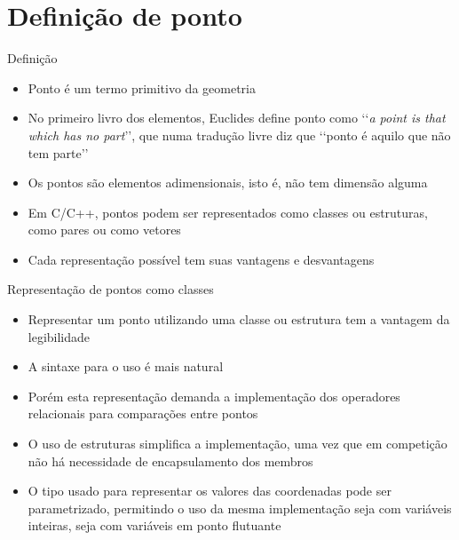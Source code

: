 \section{Definição de ponto}

\begin{frame}[fragile]{Definição}

    \begin{itemize}
        \item Ponto é um termo primitivo da geometria
        \pause

        \item No primeiro livro dos elementos, Euclides define ponto como 
            \lq\lq \textit{a point is that which has no part}\rq\rq, que numa tradução livre 
            diz que \lq\lq ponto é aquilo que não tem parte\rq\rq
        \pause

        \item Os pontos são elementos adimensionais, isto é, não tem dimensão alguma
        \pause

        \item Em C/C++, pontos podem ser representados como classes ou estruturas, como
            pares ou como vetores
        \pause

        \item Cada representação possível tem suas vantagens e desvantagens
   \end{itemize}

\end{frame}

\begin{frame}[fragile]{Representação de pontos como classes}

    \begin{itemize}
        \item Representar um ponto utilizando uma classe ou estrutura tem a vantagem da 
            legibilidade 
        \pause

        \item A sintaxe para o uso é mais natural
        \pause

        \item Porém esta representação demanda a implementação dos operadores relacionais 
            para comparações entre pontos
        \pause

        \item O uso de estruturas simplifica a implementação, uma vez que em competição não há
            necessidade de encapsulamento dos membros
        \pause

        \item O tipo usado para representar os valores das coordenadas pode ser parametrizado,
            permitindo o uso da mesma implementação seja com variáveis inteiras, seja com variáveis
            em ponto flutuante 
    \end{itemize}

\end{frame}


